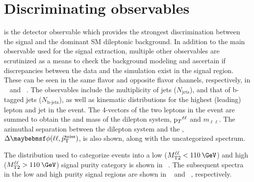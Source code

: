 \section{Discriminating observables}
\label{sec:observables}

\ptmiss is the detector observable which provides the strongest discrimination between the \ttDM signal and the dominant SM dileptonic \ttbar background. In addition to the main observable used for the signal extraction, multiple other observables are scrutinized as a means to check the background modeling and ascertain if discrepancies between the data and the simulation exist in the signal region. These can be seen in the same flavor and opposite flavor channels, respectively, in ~ and ~. The observables include the multiplicity of jets ($N_{\textrm{jets}}$), and that of b-tagged jets ($N_{\textrm{b-jets}}$), as well as kinematic distributions for the highest \pt (leading) lepton and jet in the event. The 4-vectors of the two leptons in the event are summed to obtain the \pt and mass of the dilepton system, ${\mathrm p_{T}}^{\ell\ell}$ and $m_{\ell\ell}$. The azimuthal separation between the dilepton system and the \ptvecmiss, $\Delta\phi(\ell\ell,\ptvecmiss)$, is also shown, along with the uncategorized \ptmiss spectrum.

The \mttll distribution used to categorize events into a low ($\mttll<110\:\GeV$) and high ($\mttll>110\:\GeV$) signal purity category is shown in ~. The subsequent \ptmiss spectra in the low and high purity signal regions are shown in ~ and ~, respectively. 


